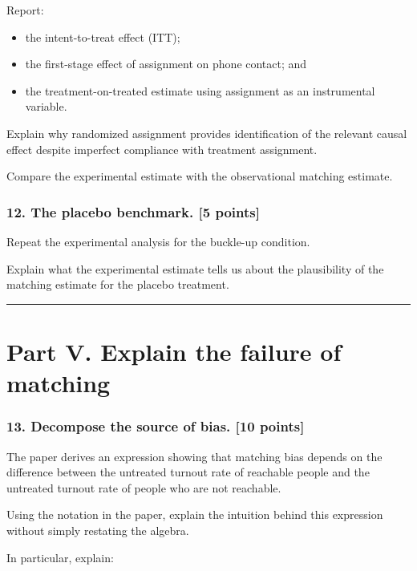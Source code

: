 \documentclass[
]{article}
\providecommand{\tightlist}{%
  \setlength{\itemsep}{0pt}\setlength{\parskip}{0pt}}
\begin{document}
Report:

\begin{itemize}
\tightlist
\item
  the intent-to-treat effect (ITT);
\item
  the first-stage effect of assignment on phone contact; and
\item
  the treatment-on-treated estimate using assignment as an instrumental
  variable.
\end{itemize}

Explain why randomized assignment provides identification of the
relevant causal effect despite imperfect compliance with treatment
assignment.

Compare the experimental estimate with the observational matching
estimate.

\subsubsection{12. The placebo benchmark. {[}5
points{]}}\label{the-placebo-benchmark.-5-points}

Repeat the experimental analysis for the buckle-up condition.

Explain what the experimental estimate tells us about the plausibility
of the matching estimate for the placebo treatment.

\begin{center}\rule{0.5\linewidth}{0.5pt}\end{center}

\section{Part V. Explain the failure of
matching}\label{part-v.-explain-the-failure-of-matching}

\subsubsection{13. Decompose the source of bias. {[}10
points{]}}\label{decompose-the-source-of-bias.-10-points}

The paper derives an expression showing that matching bias depends on
the difference between the untreated turnout rate of reachable people
and the untreated turnout rate of people who are not reachable.

Using the notation in the paper, explain the intuition behind this
expression without simply restating the algebra.

In particular, explain:
\end{document}
